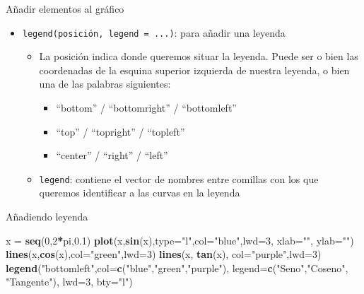 \documentclass[
  ignorenonframetext,
]{beamer}
\newenvironment{Shaded}{\begin{snugshade}}{\end{snugshade}}
\newcommand{\AttributeTok}[1]{\textcolor[rgb]{0.13,0.29,0.53}{#1}}
\newcommand{\DecValTok}[1]{\textcolor[rgb]{0.00,0.00,0.81}{#1}}
\newcommand{\FloatTok}[1]{\textcolor[rgb]{0.00,0.00,0.81}{#1}}
\newcommand{\FunctionTok}[1]{\textcolor[rgb]{0.13,0.29,0.53}{\textbf{#1}}}
\newcommand{\NormalTok}[1]{#1}
\newcommand{\OtherTok}[1]{\textcolor[rgb]{0.56,0.35,0.01}{#1}}
\newcommand{\SpecialCharTok}[1]{\textcolor[rgb]{0.81,0.36,0.00}{\textbf{#1}}}
\newcommand{\StringTok}[1]{\textcolor[rgb]{0.31,0.60,0.02}{#1}}
\providecommand{\tightlist}{%
  \setlength{\itemsep}{0pt}\setlength{\parskip}{0pt}}
\begin{document}
\begin{frame}[fragile]{Añadir elementos al gráfico}
\label{auxf1adir-elementos-al-gruxe1fico-3}
\begin{itemize}
\tightlist
\item
  \texttt{legend(posición,\ legend\ =\ ...)}: para añadir una leyenda

  \begin{itemize}
  \tightlist
  \item
    La posición indica donde queremos situar la leyenda. Puede ser o
    bien las coordenadas de la esquina superior izquierda de nuestra
    leyenda, o bien una de las palabras siguientes:

    \begin{itemize}
    \tightlist
    \item
      ``bottom'' / ``bottomright'' / ``bottomleft''
    \item
      ``top'' / ``topright'' / ``topleft''
    \item
      ``center'' / ``right'' / ``left''
    \end{itemize}
  \item
    \texttt{legend}: contiene el vector de nombres entre comillas con
    los que queremos identificar a las curvas en la leyenda
  \end{itemize}
\end{itemize}
\end{frame}

\begin{frame}[fragile]{Añadiendo leyenda}
\label{auxf1adiendo-leyenda}
\begin{Shaded}
\begin{Highlighting}[]
\NormalTok{x }\OtherTok{=} \FunctionTok{seq}\NormalTok{(}\DecValTok{0}\NormalTok{,}\DecValTok{2}\SpecialCharTok{*}\NormalTok{pi,}\FloatTok{0.1}\NormalTok{)}
\FunctionTok{plot}\NormalTok{(x,}\FunctionTok{sin}\NormalTok{(x),}\AttributeTok{type=}\StringTok{"l"}\NormalTok{,}\AttributeTok{col=}\StringTok{"blue"}\NormalTok{,}\AttributeTok{lwd=}\DecValTok{3}\NormalTok{, }\AttributeTok{xlab=}\StringTok{""}\NormalTok{, }\AttributeTok{ylab=}\StringTok{""}\NormalTok{)}
\FunctionTok{lines}\NormalTok{(x,}\FunctionTok{cos}\NormalTok{(x),}\AttributeTok{col=}\StringTok{"green"}\NormalTok{,}\AttributeTok{lwd=}\DecValTok{3}\NormalTok{)}
\FunctionTok{lines}\NormalTok{(x, }\FunctionTok{tan}\NormalTok{(x), }\AttributeTok{col=}\StringTok{"purple"}\NormalTok{,}\AttributeTok{lwd=}\DecValTok{3}\NormalTok{)}
\FunctionTok{legend}\NormalTok{(}\StringTok{"bottomleft"}\NormalTok{,}\AttributeTok{col=}\FunctionTok{c}\NormalTok{(}\StringTok{"blue"}\NormalTok{,}\StringTok{"green"}\NormalTok{,}\StringTok{"purple"}\NormalTok{), }
       \AttributeTok{legend=}\FunctionTok{c}\NormalTok{(}\StringTok{"Seno"}\NormalTok{,}\StringTok{"Coseno"}\NormalTok{, }\StringTok{"Tangente"}\NormalTok{), }
       \AttributeTok{lwd=}\DecValTok{3}\NormalTok{, }\AttributeTok{bty=}\StringTok{"l"}\NormalTok{)}
\end{Highlighting}
\end{Shaded}
\end{frame}
\end{document}
